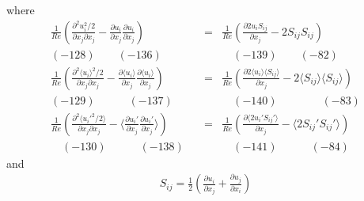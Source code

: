 \documentclass[a4paper,11pt]{article}
\begin{document}
where
\begin{eqnarray*}
\frac{1}{Re}(\frac{\partial^2 u_i^2/2 }{\partial x_j\partial x_j}-\frac{\partial u_i }{\partial x_j}\frac{\partial u_i }{\partial x_j})
&=&\frac{1}{Re}(\frac{\partial 2u_iS_{ij} }{\partial x_j}-2S_{ij}S_{ij})\\
 (-128) \qquad{} (-136)\quad{} &&\quad{} (-139) \quad{} \quad{}(-82) \nonumber \\
\frac{1}{Re}(\frac{\partial^2 \langle u_i\rangle^2 /2}{\partial x_j\partial x_j}-\frac{\partial \langle u_i\rangle }{\partial x_j} \frac{\partial \langle u_i\rangle }{\partial x_j})
&=&\frac{1}{Re}(\frac{\partial 2\langle u_i\rangle \langle S_{ij}\rangle }{\partial x_j}-2\langle S_{ij}\rangle \langle S_{ij}\rangle) \\
 (-129) \qquad{} \quad{}(-137)\quad{}&&\quad{} (-140) \qquad{} \qquad{}(-83) \nonumber \\
\frac{1}{Re}(\frac{\partial^2 \langle u_i'^2/2 \rangle}{\partial x_j\partial x_j}-\langle \frac{\partial  u_i' }{\partial x_j}\frac{\partial  u_i' }{\partial x_j}\rangle)
&=&\frac{1}{Re}(\frac{\partial \langle 2u_i'S_{ij}'\rangle }{\partial x_j}-\langle 2S_{ij}'S_{ij}'\rangle) \\
\quad{} (-130) \qquad{} \quad{}(-138)\quad{}&&\quad{} (-141) \quad{} \qquad{}(-84) \nonumber 
\end{eqnarray*}
and 
\begin{eqnarray*}
S_{ij}=\frac{1}{2}(\frac{\partial u_i}{\partial x_j}+\frac{\partial u_j}{\partial x_i}) \nonumber
\end{eqnarray*}
\end{document}
